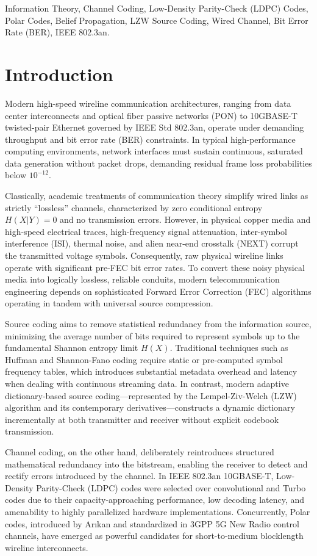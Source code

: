\documentclass[conference]{IEEEtran}
\begin{document}
\begin{IEEEkeywords}
Information Theory, Channel Coding, Low-Density Parity-Check (LDPC) Codes, Polar Codes, Belief Propagation, LZW Source Coding, Wired Channel, Bit Error Rate (BER), IEEE 802.3an.
\end{IEEEkeywords}

\section{Introduction}
Modern high-speed wireline communication architectures, ranging from data center interconnects and optical fiber passive networks (PON) to 10GBASE-T twisted-pair Ethernet governed by IEEE Std 802.3an, operate under demanding throughput and bit error rate (BER) constraints. In typical high-performance computing environments, network interfaces must sustain continuous, saturated data generation without packet drops, demanding residual frame loss probabilities below $10^{-12}$. 

Classically, academic treatments of communication theory simplify wired links as strictly ``lossless'' channels, characterized by zero conditional entropy $H(X|Y) = 0$ and no transmission errors. However, in physical copper media and high-speed electrical traces, high-frequency signal attenuation, inter-symbol interference (ISI), thermal noise, and alien near-end crosstalk (NEXT) corrupt the transmitted voltage symbols. Consequently, raw physical wireline links operate with significant pre-FEC bit error rates. To convert these noisy physical media into logically lossless, reliable conduits, modern telecommunication engineering depends on sophisticated Forward Error Correction (FEC) algorithms operating in tandem with universal source compression.

Source coding aims to remove statistical redundancy from the information source, minimizing the average number of bits required to represent symbols up to the fundamental Shannon entropy limit $H(X)$. Traditional techniques such as Huffman and Shannon-Fano coding require static or pre-computed symbol frequency tables, which introduces substantial metadata overhead and latency when dealing with continuous streaming data. In contrast, modern adaptive dictionary-based source coding—represented by the Lempel-Ziv-Welch (LZW) algorithm and its contemporary derivatives—constructs a dynamic dictionary incrementally at both transmitter and receiver without explicit codebook transmission.

Channel coding, on the other hand, deliberately reintroduces structured mathematical redundancy into the bitstream, enabling the receiver to detect and rectify errors introduced by the channel. In IEEE 802.3an 10GBASE-T, Low-Density Parity-Check (LDPC) codes were selected over convolutional and Turbo codes due to their capacity-approaching performance, low decoding latency, and amenability to highly parallelized hardware implementations. Concurrently, Polar codes, introduced by Ar{\i}kan and standardized in 3GPP 5G New Radio control channels, have emerged as powerful candidates for short-to-medium blocklength wireline interconnects.
\end{document}
